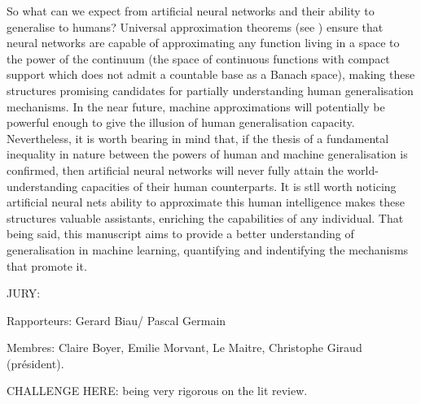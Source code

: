 So what can we expect from artificial neural networks and their ability to generalise to humans? Universal approximation theorems (see \eg \citealp{lu2017expressive,park2021minimum}) ensure that neural networks are capable of approximating any function living in a space to the power of the continuum (\eg the space of continuous functions with compact support which does not admit a countable base as a Banach space), making these structures promising candidates for partially understanding human generalisation mechanisms.
In the near future, machine approximations will potentially be powerful enough to give the illusion of human generalisation capacity. Nevertheless, it is worth bearing in mind that, if the thesis of a fundamental inequality in nature between the powers of human and machine generalisation is confirmed, then artificial neural networks will never fully attain the world-understanding capacities of their human counterparts. It is stll worth noticing artificial neural nets ability to approximate this human intelligence makes these structures valuable assistants, enriching the capabilities of any individual. That being said, this manuscript aims to provide a better understanding of generalisation in machine learning, quantifying and indentifying the mechanisms that promote it.







JURY: 


Rapporteurs: Gerard Biau/ Pascal Germain

Membres: Claire Boyer, Emilie Morvant, Le Maitre, Christophe Giraud (président).
 


CHALLENGE HERE: being very rigorous on the lit review.
\newpage